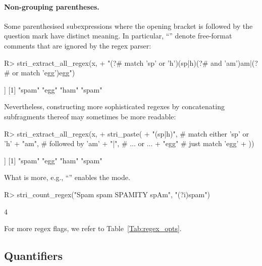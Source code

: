 \documentclass[nojss]{jss}
\newcommand{\str}[1]{\code{{#1}}}
\begin{document}
\paragraph{Non-grouping parentheses.}
Some parenthesised subexpressions where the opening bracket is followed by
the question mark have distinct meaning.
In particular, ``\str{(?\#...)}'' denote free-format comments
that are ignored by the regex parser:

\begin{Schunk}
\begin{Sinput}
R> stri_extract_all_regex(x,
+    "(?# match 'sp' or 'h')(sp|h)(?# and 'am')am|(?# or match 'egg')egg")
\end{Sinput}
\begin{Soutput}
[[1]]
[1] "spam" "egg"  "ham"  "spam"
\end{Soutput}
\end{Schunk}

\noindent
Nevertheless, constructing more sophisticated regexes by concatenating
subfragments thereof may sometimes be more readable:

\begin{Schunk}
\begin{Sinput}
R> stri_extract_all_regex(x,
+    stri_paste(
+        "(sp|h)",   # match either 'sp' or 'h'
+        "am",       # followed by 'am'
+      "|",            # ... or ...
+        "egg"       # just match 'egg'
+  ))
\end{Sinput}
\begin{Soutput}
[[1]]
[1] "spam" "egg"  "ham"  "spam"
\end{Soutput}
\end{Schunk}


What is more, e.g., ``\str{(?i)}'' enables the 
mode.

\begin{Schunk}
\begin{Sinput}
R> stri_count_regex("Spam spam SPAMITY spAm", "(?i)spam")
\end{Sinput}
\begin{Soutput}
[1] 4
\end{Soutput}
\end{Schunk}

For more regex flags, we refer to Table~\ref{Tab:regex_opts}.




\subsection{Quantifiers}
\end{document}
